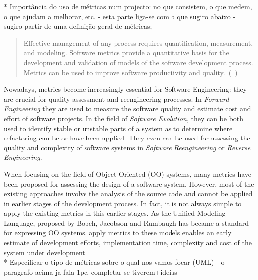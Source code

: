 

    * Importância do uso de métricas num projecto: no que consistem, o que medem, o que ajudam a melhorar, etc. - esta parte liga-se com o que sugiro abaixo - sugiro partir de uma definição geral de métricas;\\

\begin{quotation}
Effective management of any process requires quantification, measurement, and modeling. Software metrics provide a quantitative basis for the development and validation of models of the software development process. Metrics can be used to improve software productivity and quality.~(\cite{g1:Millis:1998}~)
\end{quotation}
    
Nowadays, metrics become increasingly essential for Software Engineering: they are crucial for quality assessment and reengineering processes.
In \emph{Forward Engineering} they are used to measure the software quality and estimate cost and effort of software projects\cite{Fenton}.
In the field of \emph{Software Evolution}, they can be both used to identify stable or unstable parts of a system as to determine where refactoring can be or have been applied\cite{Serge}.
They even can be used for assessing the quality and complexity of software systems in \emph{Software Reengineering} or \emph{Reverse Engineering}\cite{43044}.

When focusing on the field of Object-Oriented (OO) systems, many metrics have been proposed for assessing the design of a software system.
However, most of the existing approaches involve the analysis of the source code and cannot be applied in earlier stages of the development process.
In fact, it is not always simple to apply the existing metrics in this earlier stages. 
As the \textsf{Unified Modeling Language}, proposed by Booch, Jacobson and Rumbaugh\cite{USDPuml} has became a standard for expressing OO systems, apply metrics to these models enables an early estimate of development efforts, implementation time, complexity and cost of the system under development. \\

  * Especificar o tipo de métricas sobre o qual nos vamos focar (UML) - o paragrafo acima ja fala 1pc, completar se tiverem+ideias\\
  
